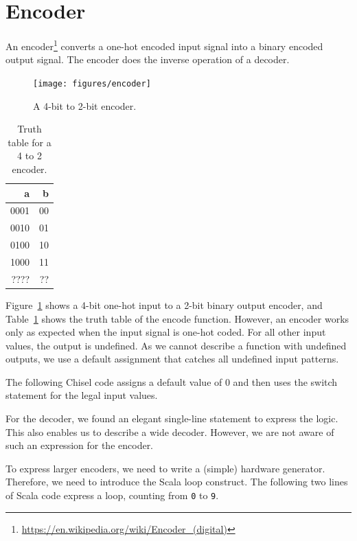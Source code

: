 \documentclass[%
    10pt,
    headinclude, footexclude,
    openright, %
    notitlepage,
    cleardoubleempty,
    headsepline,
    pointlessnumbers,
    bibtotoc, idxtotoc,
    ]{scrbook}
\newcommand{\code}[1]{{\lstinline[basicstyle=\small\ttfamily]{#1}}}
\newcommand{\myref}[2]{\href{#1}{#2}}
\renewcommand{\myref}[2]{{#2}{\footnote{\url{#1}}}}
\begin{document}
\section{Encoder}

An \myref{https://en.wikipedia.org/wiki/Encoder_(digital)}{encoder}
converts a one-hot encoded input signal into a binary encoded output signal.
The encoder does the inverse operation of a decoder.

\begin{figure}
  \centering
  \texttt{[image: figures/encoder]}
  \caption{A 4-bit to 2-bit encoder.}
  \label{fig:encoder}
\end{figure}


\begin{table}
 \centering
  \begin{tabular}{rr}
    \toprule
    a & b \\
    \midrule
    0001 & 00 \\
    0010 & 01 \\
    0100 & 10 \\
    1000 & 11 \\
    ???? & ?? \\
    \bottomrule
  \end{tabular}
  \caption{Truth table for a 4 to 2 encoder.}
 \label{tab:encoder}
\end{table}

Figure~\ref{fig:encoder} shows a 4-bit one-hot input to a 2-bit binary output encoder, and
Table~\ref{tab:encoder} shows the truth table of the encode function. However, an encoder
works only as expected when the input signal is one-hot coded. For all other input values, the output
is undefined. As we cannot describe a function with undefined outputs, we use a default
assignment that catches all undefined input patterns.

The following Chisel code assigns a default value of 0 and then uses the switch statement
for the legal input values.


For the decoder, we found an elegant single-line statement to express the logic.
This also enables us to describe a wide decoder. However, we are not aware
of such an expression for the encoder.

To express larger encoders, we need to write a (simple) hardware generator.
Therefore, we need to introduce the Scala loop construct. The following two lines
of Scala code express a loop, counting from \code{0} to \code{9}.
\end{document}

